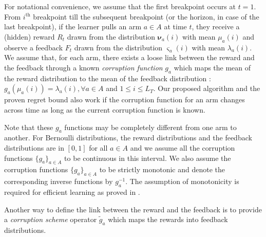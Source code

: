 \documentclass[letterpaper]{article} %
\newcommand{\MeanReAtIChanges}[2]{\mu_#1(#2)}
\newcommand{\MeanFeAtIChanges}[2]{\lambda_#1(#2)}
\newcommand{\numChanges}{L}
\newcommand{\RewardDist}[2]{\boldsymbol{\nu}_{#1}(#2)}
\newcommand{\FeedbackDist}[2]{\boldsymbol{\varsigma}_{#1}(#2)}
\begin{document}
For notational convenience, we assume that the first breakpoint occurs at $t=1$. From $i^{\text{th}}$ breakpoint till the subsequent breakpoint (or the horizon, in case of the last breakpoint), if the learner pulls an arm $ a\in A$ at time $t$, they receive a (hidden) reward $R_t$ drawn from the distribution $\RewardDist{a}{i}$ with mean $\MeanReAtIChanges{a}{i}$ and observe a feedback $F_t$ drawn from the distribution $\FeedbackDist{a}{i}$ with mean $\MeanFeAtIChanges{a}{i}$.
%
We assume that, for each arm, there exists a loose link between the reward and the feedback through a known \textit{corruption function} $g_a$ which maps the mean of the reward distribution to the mean of the feedback distribution :
$ g_a( \MeanReAtIChanges{a}{i} )= \MeanFeAtIChanges{a}{i}, \forall a\in A$ and $1\leq i \leq \numChanges_T$. Our proposed algorithm and the proven regret bound also work if the corruption function for an arm changes across time as long as the current corruption function is known. %
%

Note that these $g_a$ functions may be completely different from one arm to another.
For Bernoulli distributions, the reward distributions and the feedback distributions are in $[0,1]$ for all $a \in A$ and we assume all the corruption functions $\{g_a\}_{a \in A}$ to be continuous
in this interval. We also assume the corruption functions $\{g_a\}_{a \in A}$ to be strictly monotonic and denote the corresponding inverse functions by $g_a^{-1}$. The assumption of monotonicity is required for efficient learning as proved in \citet{pmlr-v83-gajane18a}.  
%

Another way to define the link between the reward and the feedback is to provide a \textit{corruption scheme} operator $\tilde{g}_a$ which maps the rewards into feedback distributions. 
\end{document}
